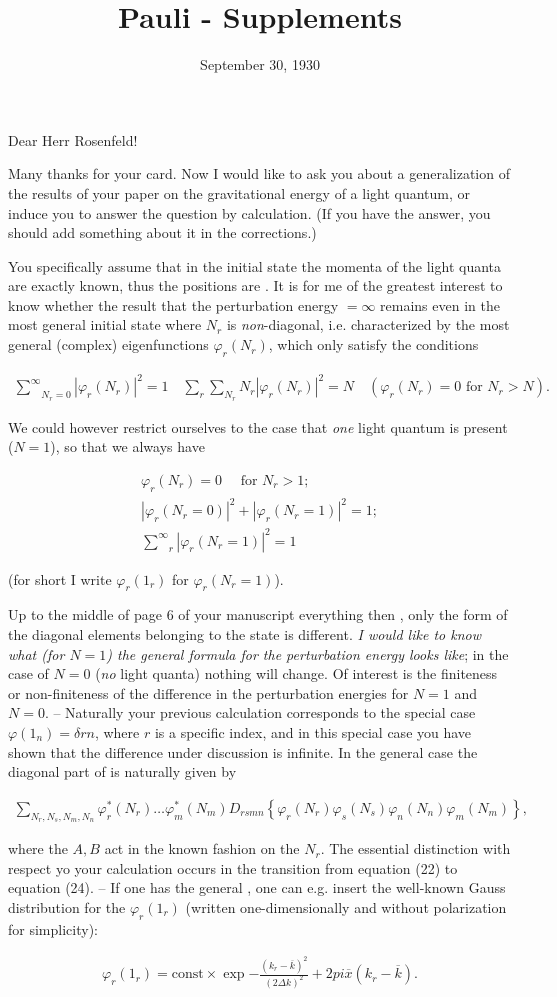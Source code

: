 \documentclass{article}
\title{Pauli - Supplements}
\newcommand{\uequ}[1]{
\begin{align*}
#1
\end{align*}
}
\newcommand{\sumXY}[2]{\underset{#1}{\overset{#2}{\sum}}}
\newcommand{\sumX}[1]{\underset{#1}{\sum}}
\begin{document}
\date{September 30, 1930}

Dear Herr Rosenfeld!

Many thanks for your card. Now I would like to ask you about a generalization of the results of your paper on the gravitational energy of a light quantum, or induce you to answer the question by calculation. (If you have the answer, you should add something about it in the corrections.)

You specifically assume that in the initial state the momenta of the light quanta are exactly known, thus the positions are . It is for me of the greatest interest to know whether the result that the perturbation energy $=\infty$ remains even in the most general initial state where $N_r$ is \textit{non}-diagonal, i.e. characterized by the most general (complex) eigenfunctions $\varphi_r(N_r)$, which only satisfy the conditions
\uequ{
\sumXY{N_r=0}{\infty}{|\varphi_r(N_r)|^2} = 1
\quad
\sumX{r}{\sumX{N_r}{N_r}{|\varphi_r(N_r)|^2}} = N
\quad
(\varphi_r(N_r) = 0 \text{ for } N_r > N).
}
We could however restrict ourselves to the case that \textit{one} light quantum is present ($N=1$), so that we always have
\uequ{
\varphi_r(N_r) = 0 \quad \text{ for } N_r > 1;\\
|\varphi_r(N_r = 0)|^2 + |\varphi_r(N_r = 1)|^2 = 1;\\
\sumXY{r}{\infty}{|\varphi_r(N_r = 1)|^2} = 1
}
(for short I write $\varphi_r(1_r)$ for $\varphi_r(N_r = 1)$).

Up to the middle of page 6 of your manuscript everything then , only the form of the diagonal elements belonging to the state is different. \textit{I would like to know what (for $N=1$) the general formula for the perturbation energy looks like}; in the case of $N=0$ (\textit{no} light quanta) nothing will change. Of interest is the finiteness or non-finiteness of the difference in the perturbation energies for $N=1$ and $N=0$. -- Naturally your previous calculation corresponds to the special case $\varphi(1_n) = \delta{rn}$, where $r$ is a specific index, and in this special case you have shown that the difference under discussion is infinite. In the general case the diagonal part of  is naturally given by
\uequ{
\sumX{N_r,N_s,N_m,N_n}{\varphi_r^*(N_r)\dots\varphi_m^*(N_m)D_{rsmn}\left\{
\varphi_r(N_r)\varphi_s(N_s)\varphi_n(N_n)\varphi_m(N_m)\right\}},
}
where the $A,B$ act in the known fashion on the $N_r$. The essential distinction with respect yo your calculation occurs in the transition from equation (22) to equation (24). -- If one has the general , one can e.g. insert the well-known Gauss distribution for the $\varphi_r(1_r)$ (written one-dimensionally and without polarization for simplicity):
\uequ{
\varphi_r(1_r) = \text{const}\times \exp{-\frac{(k_r - \overline{k})^2}{(2\Delta k)^2}} + 2 p i \overline{x}(k_r - \overline{k}).
}
\end{document}
